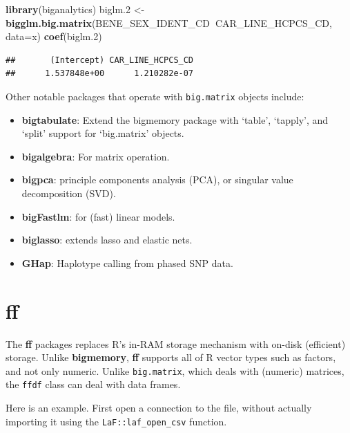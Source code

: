 \documentclass[]{book}
\newenvironment{Shaded}{\begin{snugshade}}{\end{snugshade}}
\newcommand{\KeywordTok}[1]{\textcolor[rgb]{0.13,0.29,0.53}{\textbf{#1}}}
\newcommand{\DataTypeTok}[1]{\textcolor[rgb]{0.13,0.29,0.53}{#1}}
\newcommand{\DecValTok}[1]{\textcolor[rgb]{0.00,0.00,0.81}{#1}}
\newcommand{\StringTok}[1]{\textcolor[rgb]{0.31,0.60,0.02}{#1}}
\newcommand{\OperatorTok}[1]{\textcolor[rgb]{0.81,0.36,0.00}{\textbf{#1}}}
\newcommand{\NormalTok}[1]{#1}
\providecommand{\tightlist}{%
  \setlength{\itemsep}{0pt}\setlength{\parskip}{0pt}}
\theoremstyle{definition}
\theoremstyle{definition}
\theoremstyle{definition}
\theoremstyle{remark}
\begin{document}
\begin{Shaded}
\begin{Highlighting}[]
\KeywordTok{library}\NormalTok{(biganalytics)}
\NormalTok{biglm.}\DecValTok{2}\NormalTok{ <-}\StringTok{ }\KeywordTok{bigglm.big.matrix}\NormalTok{(BENE_SEX_IDENT_CD}\OperatorTok{~}\NormalTok{CAR_LINE_HCPCS_CD, }\DataTypeTok{data=}\NormalTok{x)}
\KeywordTok{coef}\NormalTok{(biglm.}\DecValTok{2}\NormalTok{)}
\end{Highlighting}
\end{Shaded}

\begin{verbatim}
##       (Intercept) CAR_LINE_HCPCS_CD 
##      1.537848e+00      1.210282e-07
\end{verbatim}

Other notable packages that operate with \texttt{big.matrix} objects
include:

\begin{itemize}
\tightlist
\item
  \textbf{bigtabulate}: Extend the bigmemory package with `table',
  `tapply', and `split' support for `big.matrix' objects.
\item
  \textbf{bigalgebra}: For matrix operation.
\item
  \textbf{bigpca}: principle components analysis (PCA), or singular
  value decomposition (SVD).
\item
  \textbf{bigFastlm}: for (fast) linear models.
\item
  \textbf{biglasso}: extends lasso and elastic nets.
\item
  \textbf{GHap}: Haplotype calling from phased SNP data.
\end{itemize}

\section{ff}\label{ff}

The \textbf{ff} packages replaces R's in-RAM storage mechanism with
on-disk (efficient) storage. Unlike \textbf{bigmemory}, \textbf{ff}
supports all of R vector types such as factors, and not only numeric.
Unlike \texttt{big.matrix}, which deals with (numeric) matrices, the
\texttt{ffdf} class can deal with data frames.

Here is an example. First open a connection to the file, without
actually importing it using the \texttt{LaF::laf\_open\_csv} function.
\end{document}
